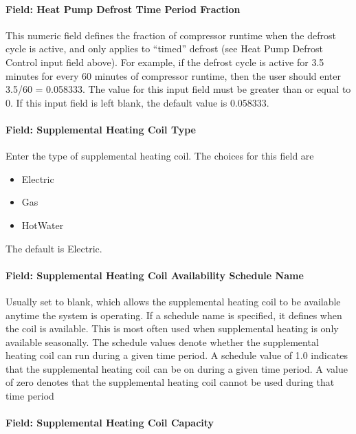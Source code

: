 \paragraph{Field: Heat Pump Defrost Time Period Fraction}\label{field-heat-pump-defrost-time-period-fraction-1}

This numeric field defines the fraction of compressor runtime when the defrost cycle is active, and only applies to ``timed'' defrost (see Heat Pump Defrost Control input field above). For example, if the defrost cycle is active for 3.5 minutes for every 60 minutes of compressor runtime, then the user should enter 3.5/60 = 0.058333. The value for this input field must be greater than or equal to 0. If this input field is left blank, the default value is 0.058333.

\paragraph{Field: Supplemental Heating Coil Type}\label{field-supplemental-heating-coil-type-2}

Enter the type of supplemental heating coil. The choices for this field are

\begin{itemize}
\item
  Electric
\item
  Gas
\item
  HotWater
\end{itemize}

The default is Electric.

\paragraph{Field: Supplemental Heating Coil Availability Schedule Name}\label{field-supplemental-heating-coil-availability-schedule-name-2}

Usually set to blank, which allows the supplemental heating coil to be available anytime the system is operating. If a schedule name is specified, it defines when the coil is available. This is most often used when supplemental heating is only available seasonally. The schedule values denote whether the supplemental heating coil can run during a given time period. A schedule value of 1.0 indicates that the supplemental heating coil can be on during a given time period. A value of zero denotes that the supplemental heating coil cannot be used during that time period

\paragraph{Field: Supplemental Heating Coil Capacity}\label{field-supplemental-heating-coil-capacity-2}

